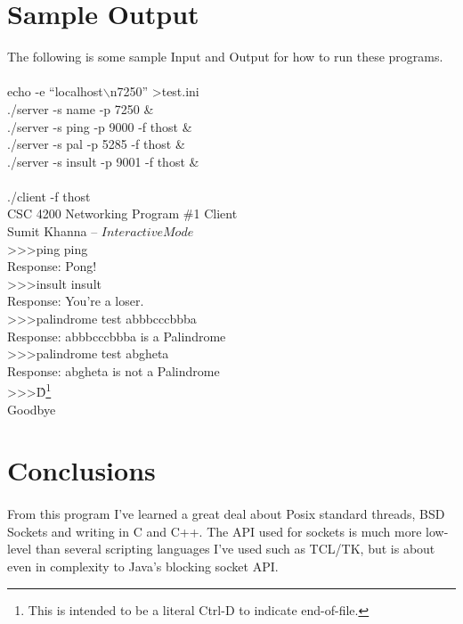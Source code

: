 \documentclass[a4paper,11pt]{article}
\begin{document}
\section{Sample Output}
The following is some sample Input and Output for how to run these programs.\\
\\
echo -e ``localhost$\backslash$n7250'' \textgreater test.ini\\
./server -s name -p 7250 \&\\
./server -s ping -p 9000 -f thost \&\\
./server -s pal -p 5285 -f thost \&\\
./server -s insult -p 9001 -f thost \&\\
\\
./client -f thost\\
CSC 4200 Networking Program \#1 Client\\
 Sumit Khanna -- \(Interactive Mode\)\\
\textgreater\textgreater\textgreater ping ping\\
Response: Pong!\\
\textgreater\textgreater\textgreater insult insult\\
Response: You're a loser.\\
\textgreater\textgreater\textgreater palindrome test abbbcccbbba\\
Response: abbbcccbbba is a Palindrome\\
\textgreater\textgreater\textgreater palindrome test abgheta\\
Response: abgheta is not a Palindrome\\
\textgreater\textgreater\textgreater \^D\footnote{This is intended to be a literal Ctrl-D to indicate end-of-file.}\\
Goodbye\\

\section{Conclusions}
\paragraph{}From this program I've learned a great deal about Posix standard threads, BSD Sockets and writing in C and C++. The API used for sockets is much more low-level than several scripting languages I've used such as TCL/TK, but is about even in complexity to Java's blocking socket API.
\end{document}
